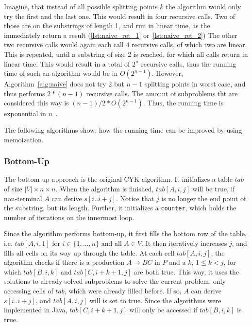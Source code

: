 Imagine, that instead of all possible splitting points $k$ the algorithm would only try the first and the last one.
This would result in four recursive calls.
Two of those are on the substrings of length 1, and run in linear time, as the immediately return a result (\ref{lst:naive_ret_1} or~\ref{lst:naive_ret_2})
The other two recursive calls would again each call 4 recursive calls, of which two are linear.
This is repeated, until a substring of size 2 is reached, for which all calls return in linear time.
This would result in a total of $2^n$ recursive calls, thus the running time of such an algorithm would be in $O(2^{n-1})$.
However, Algorithm~\ref{alg:naive} does not try 2 but $n-1$ splitting points in worst case, and thus performs $2*(n-1)$ recursive calls.
The amount of subproblems tht are considered this way is $(n-1)/2 * O(2^{n-1})$.
Thus, the running time is exponential in $n$~\cite{automata}.

The following algorithms show, how the running time can be improved by using memoization.


\subsubsection{Bottom-Up}
\label{sec:bottom_up}
The bottom-up approach is the original CYK-algorithm.
It initializes a table $tab$ of size $|V|\times n\times n$.
When the algorithm is finished, $tab[A,i,j]$ will be true, if non-terminal $A$ can derive $s[i..i+j]$.
Notice that $j$ is no longer the end point of the substring, but its length.
Further, it initializes a \texttt{counter}, which holds the number of iterations on the innermost loop.

Since the algorithm performs bottom-up, it first fills the bottom row of the table, i.e. $tab[A,i,1]$ for $i\in\{1,\dots,n\}$ and all $A\in V$.
It then iteratively increases $j$, and fills all cells on its way up through the table.
At each cell $tab[A,i,j]$, the algorithm checks if there is a production $A\rightarrow BC$ in $P$ and a $k$, $1 \leq k < j$, for which $tab[B,i,k]$ and $tab[C,i+k+1, j]$ are both true.
This way, it uses the solutions to already solved subproblems to solve the current problem, only accessing cells of $tab$, which were already filled before.
If so, $A$ can derive $s[i..i+j]$, and $tab[A,i,j]$ will is set to true.
Since the algorithms were implemented in Java, $tab[C,i+k+1, j]$ will only be accessed if $tab[B,i,k]$ is true. 


